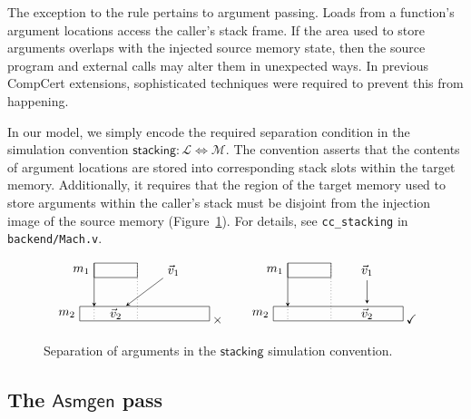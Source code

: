 \documentclass[11pt,oneside,draft]{book}
\theoremstyle{definition}
\newcommand{\kw}[1]{\ensuremath{ \mathsf{#1} }}
\begin{document}
The exception to the rule pertains to argument passing.
Loads from a function's argument locations
access the caller's stack frame.
If the area used to store arguments
overlaps with the injected source memory state,
then the source program and external calls
may alter them in unexpected ways.
In previous CompCert extensions,
sophisticated techniques were required
to prevent this from happening.

In our model,
we simply encode the required separation condition
in the simulation convention
$\kw{stacking} : \mathcal{L} \Leftrightarrow \mathcal{M}$.
The convention
asserts that the contents of argument locations
are stored into corresponding stack slots
within the target memory.
Additionally, it
requires that the region of the target memory
used to store arguments within the caller's stack
must be disjoint from the injection image of the source memory
(Figure~\ref{fig:stacking}).
For details,
see \texttt{cc\_stacking} in \texttt{backend/Mach.v}.

\begin{figure}
\[
  \begin{tikzpicture}[scale=0.4,>=stealth]
    \draw ( 1,3) rectangle +(3,1); \node[left] at (1,3.5) {$m_1$};
    \draw ( 0,0) rectangle +(9,1); \node[left] at (0,0.5) {$m_2$};
    \node (V1) at (6.5,3.5) {$\vec{v}_1$};
    \node (V2) at (2.5,0.5) {$\vec{v}_2$};
    \draw[->] (1,4) -- (1,1); \draw[dotted] (1,1) -- (1,0); \draw[dotted] (4,4) -- (4,0);
    \draw[->] (V1) -- (V2);
  \end{tikzpicture}
  \:{\times}
  \qquad
  \begin{tikzpicture}[scale=0.4,>=stealth]
    \draw ( 1,3) rectangle +(3,1); \node[left] at (1,3.5) {$m_1$};
    \draw ( 0,0) rectangle +(9,1); \node[left] at (0,0.5) {$m_2$};
    \node (V1) at (6.5,3.5) {$\vec{v}_1$};
    \node (V2) at (6.5,0.5) {$\vec{v}_2$};
    \draw[->] (1,4) -- (1,1); \draw[dotted] (1,1) -- (1,0); \draw[dotted] (4,4) -- (4,0);
    \draw[->] (V1) -- (V2);
  \end{tikzpicture}
  \:{\checkmark}
\]
  \caption{Separation of arguments
    in the \kw{stacking} simulation convention.}
  \label{fig:stacking}
\end{figure}


\subsection{The \kw{Asmgen} pass} \label{sec:asmgen} %
\end{document}
